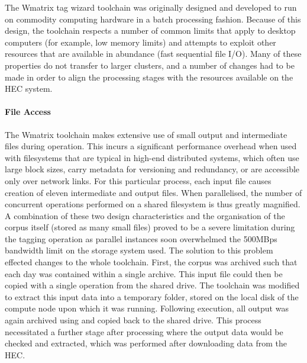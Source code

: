 
The Wmatrix tag wizard toolchain was originally designed and developed to run on commodity computing hardware in a batch processing fashion.  Because of this design, the toolchain respects a number of common limits that apply to desktop computers (for example, low memory limits) and attempts to exploit other resources that are available in abundance (fast sequential file I/O).
Many of these properties do not transfer to larger clusters, and a number of changes had to be made in order to align the processing stages with the resources available on the HEC system.


\paragraph{File Access}
The Wmatrix toolchain makes extensive use of small output and intermediate files during operation.  This incurs a significant performance overhead when used with filesystems that are typical in high-end distributed systems, which often use large block sizes, carry metadata for versioning and redundancy, or are accessible only over network links.
For this particular process, each input file causes creation of eleven intermediate and output files.  When parallelised, the number of concurrent operations performed on a shared filesystem is thus greatly magnified.
A combination of these two design characteristics and the organisation of the corpus itself (stored as many small files) proved to be a severe limitation during the tagging operation as parallel instances soon overwhelmed the 500MBps bandwidth limit on the storage system used.
The solution to this problem effected changes to the whole toolchain.  First, the corpus was archived such that each day was contained within a single  archive.  This input file could then be copied with a single operation from the shared drive.
The toolchain was modified to extract this input data into a temporary folder, stored on the local disk of the compute node upon which it was running.
Following execution, all output was again archived using  and copied back to the shared drive.  This process necessitated a further stage after processing where the output data would be checked and extracted, which was performed after downloading data from the HEC.


